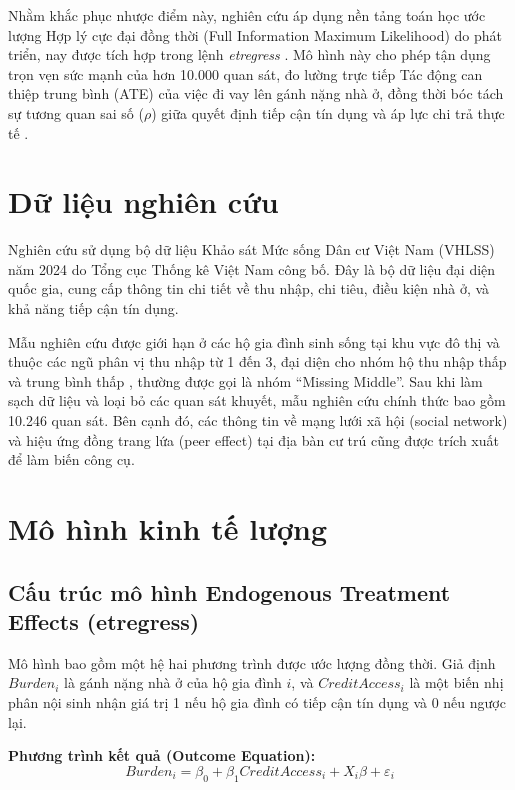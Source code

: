 \documentclass[12pt,a4paper]{report}
\begin{document}
Nhằm khắc phục nhược điểm này, nghiên cứu áp dụng nền tảng toán học ước lượng Hợp lý cực đại đồng thời (Full Information Maximum Likelihood) do \textcite{Maddala1983} phát triển, nay được tích hợp trong lệnh \textit{etregress} \parencite{StataEtregress2025, Wooldridge2010}. Mô hình này cho phép tận dụng trọn vẹn sức mạnh của hơn 10.000 quan sát, đo lường trực tiếp Tác động can thiệp trung bình (ATE) của việc đi vay lên gánh nặng nhà ở, đồng thời bóc tách sự tương quan sai số ($\rho$) giữa quyết định tiếp cận tín dụng và áp lực chi trả thực tế \parencite{lewisfaupel2024disparities}.

\section{Dữ liệu nghiên cứu}

Nghiên cứu sử dụng bộ dữ liệu Khảo sát Mức sống Dân cư Việt Nam (VHLSS) năm 2024 do Tổng cục Thống kê Việt Nam công bố. Đây là bộ dữ liệu đại diện quốc gia, cung cấp thông tin chi tiết về thu nhập, chi tiêu, điều kiện nhà ở, và khả năng tiếp cận tín dụng.

Mẫu nghiên cứu được giới hạn ở các hộ gia đình sinh sống tại khu vực đô thị và thuộc các ngũ phân vị thu nhập từ 1 đến 3, đại diện cho nhóm hộ thu nhập thấp và trung bình thấp , thường được gọi là nhóm ``Missing Middle''. Sau khi làm sạch dữ liệu và loại bỏ các quan sát khuyết, mẫu nghiên cứu chính thức bao gồm 10.246 quan sát. Bên cạnh đó, các thông tin về mạng lưới xã hội (social network) và hiệu ứng đồng trang lứa (peer effect) tại địa bàn cư trú cũng được trích xuất để làm biến công cụ.

\section{Mô hình kinh tế lượng}

\subsection{Cấu trúc mô hình Endogenous Treatment Effects (etregress)}

Mô hình bao gồm một hệ hai phương trình được ước lượng đồng thời. Giả định $Burden_i$ là gánh nặng nhà ở của hộ gia đình $i$, và $CreditAccess_i$ là một biến nhị phân nội sinh nhận giá trị 1 nếu hộ gia đình có tiếp cận tín dụng và 0 nếu ngược lại.

\textbf{Phương trình kết quả (Outcome Equation):}
\begin{equation}
	Burden_i = \beta_0 + \beta_1 CreditAccess_i + X_i \beta + \varepsilon_i
	\label{eq:outcome}
\end{equation}
\end{document}
